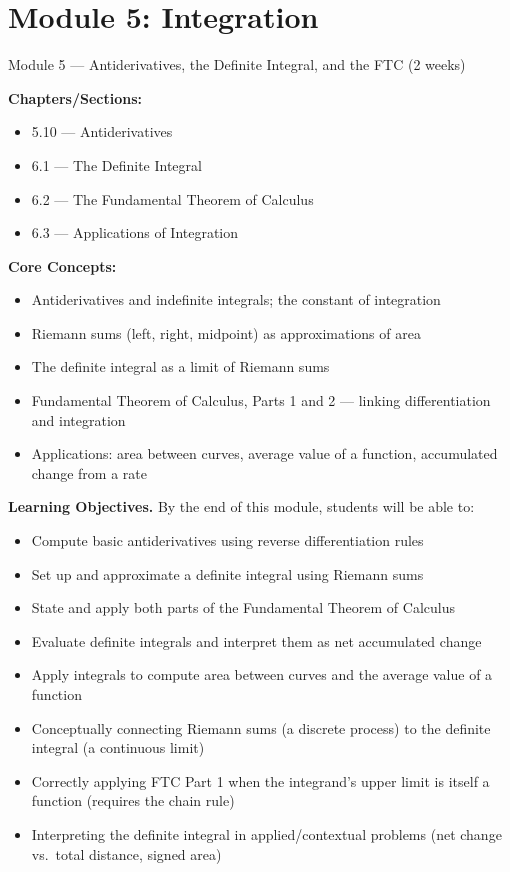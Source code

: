 \documentclass[11pt]{article}
\newcommand{\loheader}{\textbf{Learning Objectives.} By the end of this module, students will be able to:}
\begin{document}
\section{Module 5: Integration}
\label{mod:5}
\begin{modulebox}{Module 5 --- Antiderivatives, the Definite Integral, and the FTC \hfill (2 weeks)}

\textbf{Chapters/Sections:}
\begin{itemize}[nosep]
  \item 5.10 --- Antiderivatives
  \item 6.1 --- The Definite Integral
  \item 6.2 --- The Fundamental Theorem of Calculus
  \item 6.3 --- Applications of Integration
\end{itemize}

\textbf{Core Concepts:}
\begin{itemize}[nosep]
  \item Antiderivatives and indefinite integrals; the constant of integration
  \item Riemann sums (left, right, midpoint) as approximations of area
  \item The definite integral as a limit of Riemann sums
  \item Fundamental Theorem of Calculus, Parts 1 and 2 --- linking differentiation and integration
  \item Applications: area between curves, average value of a function, accumulated change from a rate
\end{itemize}

\loheader
\begin{itemize}[nosep]
  \item Compute basic antiderivatives using reverse differentiation rules
  \item Set up and approximate a definite integral using Riemann sums
  \item State and apply both parts of the Fundamental Theorem of Calculus
  \item Evaluate definite integrals and interpret them as net accumulated change
  \item Apply integrals to compute area between curves and the average value of a function
\end{itemize}
\end{modulebox}

\begin{diffbox}
\begin{itemize}[nosep]
  \item Conceptually connecting Riemann sums (a discrete process) to the definite integral (a continuous limit)
  \item Correctly applying FTC Part 1 when the integrand's upper limit is itself a function (requires the chain rule)
  \item Interpreting the definite integral in applied/contextual problems (net change vs.\ total distance, signed area)
\end{itemize}
\end{diffbox}
\end{document}
